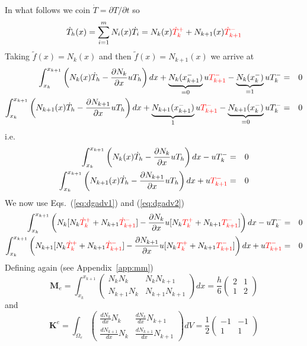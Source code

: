 In what follows we coin $\dot{T}=\partial T/\partial t$ so
\begin{equation}
\dot{T}_h(x) 
= \sum_{i=1}^m N_i(x) \dot{T}_i 
= N_k(x) {\color{red}\dot{T}_k^+} + N_{k+1}(x) {\color{red}\dot{T}_{k+1}^-}
\label{eq:dgadv2} 
\end{equation}
Taking $\tilde{f}(x)=N_k(x)$ and then $\tilde{f}(x)=N_{k+1}(x)$ we arrive at
\begin{eqnarray}
\int_{x_k}^{x_{k+1}}\left(
N_k(x) \dot{T}_h -
\frac{\partial N_k}{\partial x} uT_h \right) dx
+\underbrace{N_k(x_{k+1}^-)}_{=0}u {\color{red}T_{k+1}^-}     - \underbrace{N_k (x_{k}^-)}_{=1}uT_{k}^- &=& 0 \\
\int_{x_k}^{x_{k+1}}\left(
N_{k+1}(x) \dot{T}_h -
\frac{\partial N_{k+1}}{\partial x} uT_h \right) dx
+ \underbrace{N_{k+1}(x_{k+1}^-)}_{1}u {\color{red}T_{k+1}^-}     -\underbrace{N_{k+1}(x_{k}^-)}_{=0}uT_{k}^- &=& 0
\end{eqnarray}
i.e.
\begin{eqnarray}
\int_{x_k}^{x_{k+1}}\left(
N_k(x) \dot{T}_h -
\frac{\partial N_k}{\partial x} uT_h \right) dx
   -  uT_{k}^- &=& 0 \\
\int_{x_k}^{x_{k+1}}\left(
N_{k+1}(x)  \dot{T}_h -
\frac{\partial N_{k+1}}{\partial x} uT_h \right) dx
+ u{\color{red} T_{k+1}^-}      &=& 0
\end{eqnarray}
We now use Eqs.~(\ref{eq:dgadv1}) and (\ref{eq:dgadv2})
\begin{eqnarray}
\int_{x_k}^{x_{k+1}}\left(
N_k
[N_k {\color{red}\dot{T}_k^+} + N_{k+1} {\color{red}\dot{T}_{k+1}^-}]
-
\frac{\partial N_k}{\partial x} u
[N_k {\color{red}T_k^+} + N_{k+1} {\color{red}T_{k+1}^-}]
 \right) dx
   -  uT_{k}^- &=& 0 \\
\int_{x_k}^{x_{k+1}}\left(
N_{k+1} 
[N_k {\color{red}\dot{T}_k^+} + N_{k+1} {\color{red}\dot{T}_{k+1}^-}]
 -
\frac{\partial N_{k+1}}{\partial x} u
[N_k {\color{red}T_k^+} + N_{k+1} {\color{red}T_{k+1}^-}]
\right) dx
+ u{\color{red} T_{k+1}^-}      &=& 0
\end{eqnarray}
Defining again (see Appendix~\ref{app:mm})
\[
{\bm M}_e=
\int_{x_k}^{x_{k+1}}
\left(
\begin{array}{cc}
N_kN_k & N_k N_{k+1} \\
N_{k+1}N_k & N_{k+1} N_{k+1} 
\end{array}
\right)
dx
= 
\frac{h}{6}
\left(
\begin{array}{cc}
2  & 1 \\
1 & 2
\end{array}
\right)
\]
and 
\[
{\bm K}^e =
\int_{\Omega_e} 
\left(
\begin{array}{cc}
\frac{dN_k}{dx} N_k     & \frac{dN_k}{dx} N_{k+1} \\
\frac{dN_{k+1}}{dx} N_k & \frac{dN_{k+1}}{dx} N_{k+1}
\end{array}
\right)
dV
=
\frac{1}{2}
\left(
\begin{array}{cc}
-1  & -1 \\
1 & 1
\end{array}
\right)
\]
